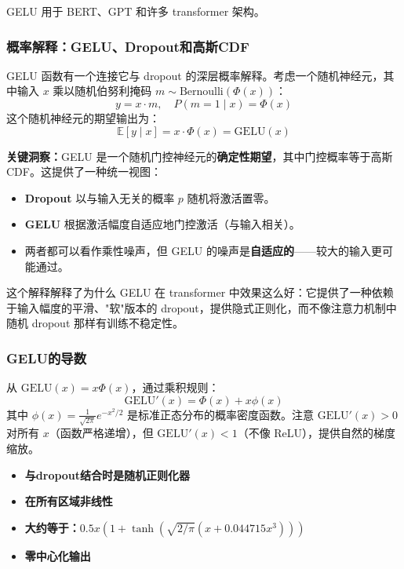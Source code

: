 GELU 用于 BERT、GPT 和许多 transformer 架构。

\subsubsection{概率解释：GELU、Dropout和高斯CDF}

GELU 函数有一个连接它与 dropout \cite{clark2022unified} 的深层概率解释。考虑一个随机神经元，其中输入 $x$ 乘以随机伯努利掩码 $m \sim \text{Bernoulli}(\Phi(x))$：
\begin{equation}
y = x \cdot m, \quad P(m = 1 \mid x) = \Phi(x)
\end{equation}
这个随机神经元的期望输出为：
\begin{equation}
\mathbb{E}[y \mid x] = x \cdot \Phi(x) = \text{GELU}(x)
\end{equation}

\textbf{关键洞察：}GELU 是一个随机门控神经元的\textbf{确定性期望}，其中门控概率等于高斯 CDF。这提供了一种统一视图：
\begin{itemize}
    \item \textbf{Dropout} 以与输入无关的概率 $p$ 随机将激活置零。
    \item \textbf{GELU} 根据激活幅度自适应地门控激活（与输入相关）。
    \item 两者都可以看作乘性噪声，但 GELU 的噪声是\textbf{自适应的}——较大的输入更可能通过。
\end{itemize}

这个解释解释了为什么 GELU 在 transformer 中效果这么好：它提供了一种依赖于输入幅度的平滑、"软"版本的 dropout，提供隐式正则化，而不像注意力机制中随机 dropout 那样有训练不稳定性。

\subsubsection{GELU的导数}

从 $\text{GELU}(x) = x\Phi(x)$，通过乘积规则：
\begin{equation}
\text{GELU}'(x) = \Phi(x) + x\phi(x)
\end{equation}
其中 $\phi(x) = \frac{1}{\sqrt{2\pi}}e^{-x^2/2}$ 是标准正态分布的概率密度函数。注意 $\text{GELU}'(x) > 0$ 对所有 $x$（函数严格递增），但 $\text{GELU}'(x) < 1$（不像 ReLU），提供自然的梯度缩放。

\begin{properties}[GELU的性质]
\begin{itemize}
    \item \textbf{与dropout结合时是随机正则化器}
    \item \textbf{在所有区域非线性}
    \item \textbf{大约等于：}$0.5x(1 + \tanh(\sqrt{2/\pi}(x + 0.044715x^3)))$
    \item \textbf{零中心化输出}
\end{itemize}
\end{properties}

